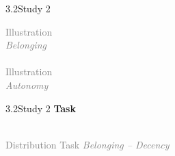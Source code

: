 \documentclass[xcolor=table,9pt,aspectratio=169]{beamer}
\begin{document}
\begin{frame}{\vspace*{10mm}3.2\hspace*{1em}Study 2}
\begin{multicols}{4}
\begin{center}
      \textcolor{gray}{Illustration\\\textit{Belonging}}\\
      \\
      \textcolor{gray}{Illustration\\\textit{Autonomy}}\\
   \end{center}
\end{multicols}
\end{frame}


\begin{frame}{\vspace*{10mm}3.2\hspace*{1em}Study 2}
\textbf{Task}\\
\medskip
\begin{center}
   \\
   \textcolor{gray}{Distribution Task \textit{Belonging -- Decency}}
\end{center}
\end{frame}
\end{document}
